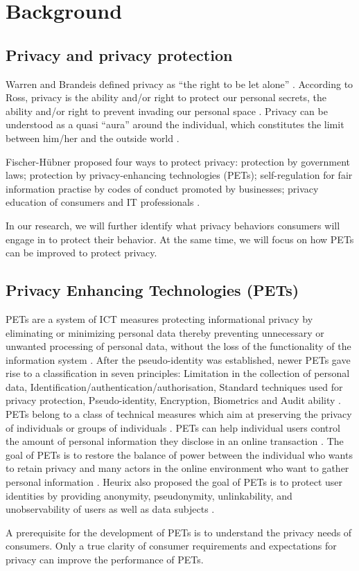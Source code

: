 \section{Background}
\label{sec:2}

\subsection{Privacy and privacy protection}
\label{Label2} 
 

Warren and Brandeis defined privacy as “the right to be let alone” \cite{seven}. According to Ross, privacy is the ability and/or right to protect our personal secrets, the ability and/or right to prevent invading our personal space \cite{eight}. Privacy can be understood as a quasi “aura” around the individual, which constitutes the limit between him/her and the outside world \cite{nine}. 

Fischer-Hübner proposed four ways to protect privacy: protection by government laws; protection by privacy-enhancing technologies (PETs); self-regulation for fair information practise by codes of conduct promoted by businesses; privacy education of consumers and IT professionals \cite{ten}. 

In our research, we will further identify what privacy behaviors consumers will engage in to protect their behavior. At the same time, we will focus on how PETs can be improved to protect privacy. 

\subsection{Privacy Enhancing Technologies (PETs)}
\label{Label2} 

PETs are a system of ICT measures protecting informational privacy by eliminating or minimizing personal data thereby preventing unnecessary or unwanted processing of personal data, without the loss of the functionality of the information system \cite{eleven}. After the pseudo-identity was established, newer PETs gave rise to a classification in seven principles: Limitation in the collection of personal data, Identification/authentication/authorisation, Standard techniques used for privacy protection, Pseudo-identity, Encryption, Biometrics and Audit ability \cite{eleven}. PETs belong to a class of technical measures which aim at preserving the privacy of individuals or groups of individuals \cite{twelve}. PETs can help individual users control the amount of personal information they disclose in an online transaction \cite{thirteen}. The goal of PETs is to restore the balance of power between the individual who wants to retain privacy and many actors in the online environment who want to gather personal information \cite{thirteen}. Heurix also proposed the goal of PETs is to protect user identities by providing anonymity, pseudonymity, unlinkability, and unobservability of users as well as data subjects \cite{twelve}. 

A prerequisite for the development of PETs is to understand the privacy needs of consumers. Only a true clarity of consumer requirements and expectations for privacy can improve the performance of PETs. 
